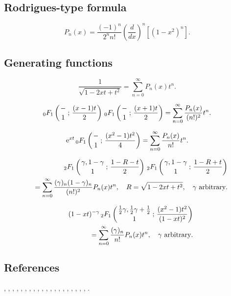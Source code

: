 \documentclass[envcountchap,graybox]{svmono}
\newcommand{\hyp}[5]{\mbox{}_{#1}{F}_{#2}
\left(\genfrac{}{}{0pt}{}{#3}{#4}\,;\,#5\right)}
\newcommand{\e}{\textrm{e}}
\begin{document}
\subsection*{Rodrigues-type formula}
\begin{equation}
\label{RodLegendre}
P_n(x)=\frac{(-1)^n}{2^nn!}\left(\frac{d}{dx}\right)^n\left[(1-x^2)^n\right].
\end{equation}

\subsection*{Generating functions}
\begin{equation}
\label{GenLegendre1}
\frac{1}{\sqrt{1-2xt+t^2}}=\sum_{n=0}^{\infty}P_n(x)t^n.
\end{equation}

\begin{equation}
\label{GenLegendre2}
\hyp{0}{1}{-}{1}{\frac{(x-1)t}{2}}\,\hyp{0}{1}{-}{1}{\frac{(x+1)t}{2}}=
\sum_{n=0}^{\infty}\frac{P_n(x)}{(n!)^2}t^n.
\end{equation}

\begin{equation}
\label{GenLegendre3}
\e^{xt}\,\hyp{0}{1}{-}{1}{\frac{(x^2-1)t^2}{4}}=
\sum_{n=0}^{\infty}\frac{P_n(x)}{n!}t^n.
\end{equation}

\begin{eqnarray}
\label{GenLegendre4}
& &\hyp{2}{1}{\gamma,1-\gamma}{1}{\frac{1-R-t}{2}}\,
\hyp{2}{1}{\gamma,1-\gamma}{1}{\frac{1-R+t}{2}}\nonumber\\
& &{}=\sum_{n=0}^{\infty}\frac{(\gamma)_n(1-\gamma)_n}{(n!)^2}P_n(x)t^n,
\quad R=\sqrt{1-2xt+t^2},\quad\textrm{$\gamma$ arbitrary}.
\end{eqnarray}

\begin{eqnarray}
\label{GenLegendre5}
& &(1-xt)^{-\gamma}\,\hyp{2}{1}{\frac{1}{2}\gamma,\frac{1}{2}\gamma+\frac{1}{2}}{1}
{\frac{(x^2-1)t^2}{(1-xt)^2}}\nonumber\\
& &{}=\sum_{n=0}^{\infty}\frac{(\gamma)_n}{n!}P_n(x)t^n,\quad\textrm{$\gamma$ arbitrary}.
\end{eqnarray}

\subsection*{References}
\cite{Abram}, \cite{Alladi}, \cite{AlSalam90}, \cite{Bhonsle}, \cite{Brafman51},
\cite{Carlitz57II}, \cite{Chihara78}, \cite{Danese}, \cite{Dattoli2001},
\cite{DilcherStolarsky}, \cite{ElbertLaforgia94}, \cite{Erdelyi+}, \cite{Grad},
\cite{Mathai}, \cite{Nikiforov+}, \cite{NikiforovUvarov}, \cite{Olver}, \cite{Rainville},
\cite{Szego75}, \cite{Temme}, \cite{Zayed}.
\end{document}
